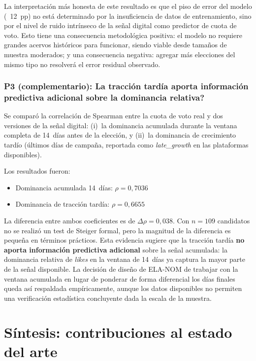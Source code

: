 La interpretación más honesta de este resultado es que el piso de error del modelo (~12~pp) no está determinado por la insuficiencia de datos de entrenamiento, sino por el nivel de ruido intrínseco de la señal digital como predictor de cuota de voto. Esto tiene una consecuencia metodológica positiva: el modelo no requiere grandes acervos históricos para funcionar, siendo viable desde tamaños de muestra moderados; y una consecuencia negativa: agregar más elecciones del mismo tipo no resolverá el error residual observado.

\subsubsection*{P3 (complementario): \textquestiondown{}La tracción tardía aporta información predictiva adicional sobre la dominancia relativa?}

Se comparó la correlación de Spearman entre la cuota de voto real y dos versiones de la señal digital: (i)~la dominancia acumulada durante la ventana completa de 14~días antes de la elección, y (ii)~la dominancia de crecimiento tardío (últimos días de campaña, reportada como \textit{late\_growth} en las plataformas disponibles).

Los resultados fueron:
\begin{itemize}
    \item Dominancia acumulada 14~días: $\rho = 0{,}7036$
    \item Dominancia de tracción tardía: $\rho = 0{,}6655$
\end{itemize}

La diferencia entre ambos coeficientes es de $\Delta\rho = 0{,}038$. Con $n=109$ candidatos no se realizó un test de Steiger formal, pero la magnitud de la diferencia es pequeña en términos prácticos. Esta evidencia sugiere que la tracción tardía \textbf{no aporta información predictiva adicional} sobre la señal acumulada: la dominancia relativa de \textit{likes} en la ventana de 14~días ya captura la mayor parte de la señal disponible. La decisión de diseño de ELA-NOM de trabajar con la ventana acumulada en lugar de ponderar de forma diferencial los días finales queda así respaldada empíricamente, aunque los datos disponibles no permiten una verificación estadística concluyente dada la escala de la muestra.

\section{Síntesis: contribuciones al estado del arte}

